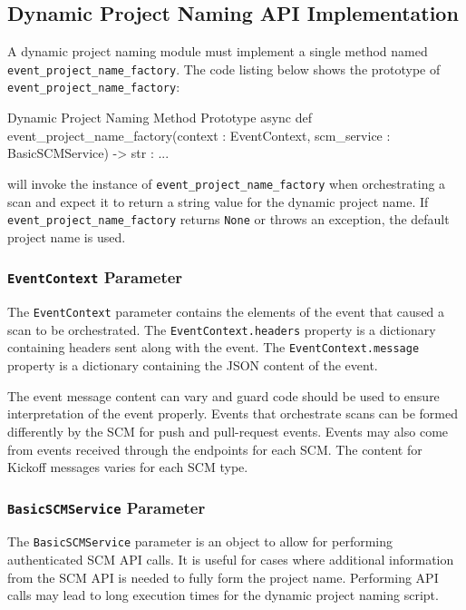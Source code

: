\subsection{Dynamic Project Naming API Implementation}

A dynamic project naming module must implement a single method named \texttt{event\_project\_name\_factory}. The code
listing below shows the prototype of \texttt{event\_project\_name\_factory}:

\begin{code}{Dynamic Project Naming Method Prototype}{}{}
async def event_project_name_factory(context : EventContext, scm_service : BasicSCMService) -> str : ...
\end{code}

\cxoneflow will invoke the instance of \texttt{event\_project\_name\_factory} when orchestrating a scan and expect
it to return a string value for the dynamic project name.  If \texttt{event\_project\_name\_factory} returns \texttt{None}
or throws an exception, the default project name is used.

\subsubsection{\texttt{EventContext} Parameter}

The \texttt{EventContext} parameter contains the elements of the event that caused a scan to be orchestrated.
The \texttt{EventContext.headers} property is a dictionary containing headers sent along with the event.  The
\texttt{EventContext.message} property is a dictionary containing the JSON content of the event.

The event message content can vary and guard code should be used to ensure interpretation of the event properly.
Events that orchestrate scans can be formed differently by the SCM for push and pull-request events.  Events may also
come from events received through the  endpoints for each SCM.  The content for Kickoff
messages varies for each SCM type.

\subsubsection{\texttt{BasicSCMService} Parameter}

The \texttt{BasicSCMService} parameter is an object to allow for performing authenticated SCM API calls.  It is useful for
cases where additional information from the SCM API is needed to fully form the project name.  Performing API calls may
lead to long execution times for the dynamic project naming script.

